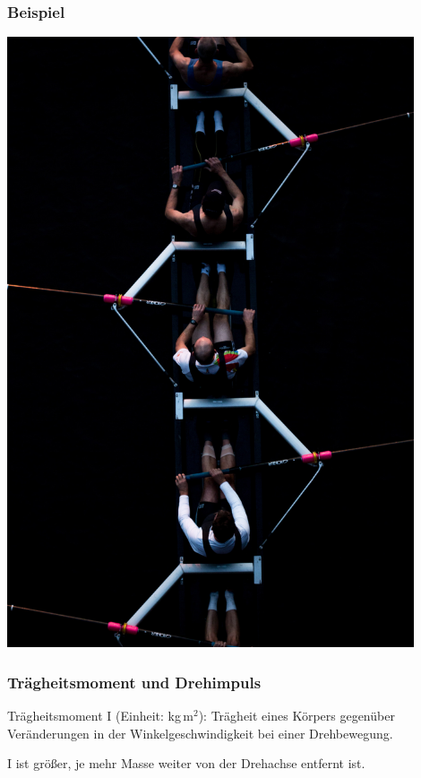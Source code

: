 \documentclass{beamer}
\begin{document}
\begin{frame}
\frametitle{Beispiel}

\begin{center}
\includegraphics[width=0.9\textwidth]{rowing.jpg}
\end{center}

\end{frame}
 







\begin{frame}
\frametitle{Trägheitsmoment und Drehimpuls}


Trägheitsmoment I (Einheit:  kg\(\,\)m$^2$): Trägheit eines Körpers gegenüber Veränderungen in der Winkelgeschwindigkeit bei einer Drehbewegung. 

I ist größer, je mehr Masse weiter von der Drehachse entfernt ist. 




\end{frame}
\end{document}
